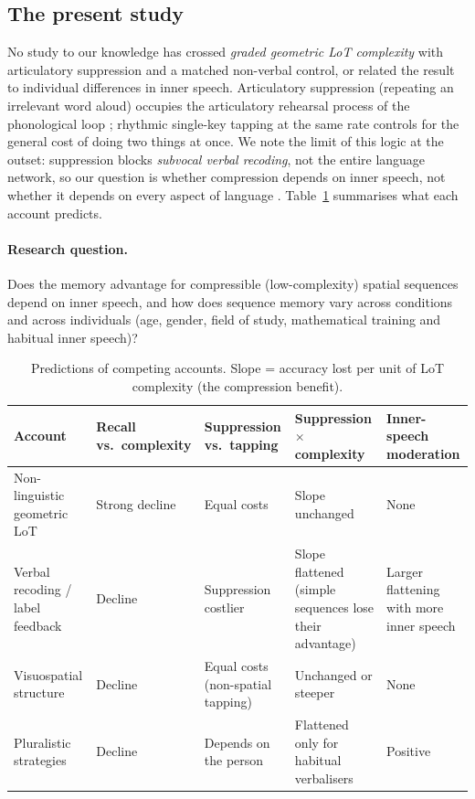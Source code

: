 \documentclass[11pt,a4paper]{article}
\begin{document}
\subsection{The present study}
No study to our knowledge has crossed \emph{graded geometric LoT complexity} with articulatory suppression and a matched
non-verbal control, or related the result to individual differences in inner speech. Articulatory suppression (repeating an
irrelevant word aloud) occupies the articulatory rehearsal process of the phonological loop
\citep{baddeley1984exploring,baddeley2012working}; rhythmic single-key tapping at the same rate controls for the general cost
of doing two things at once. We note the limit of this logic at the outset: suppression blocks \emph{subvocal verbal recoding},
not the entire language network, so our question is whether compression depends on inner speech, not whether it depends on
every aspect of language \citep{fedorenko2024language}. Table~\ref{tab:predictions} summarises what each account predicts.

\paragraph{Research question.} Does the memory advantage for compressible (low-complexity) spatial sequences depend on inner
speech, and how does sequence memory vary across conditions and across individuals (age, gender, field of study, mathematical
training and habitual inner speech)?

\begin{table}[t]\centering\small
\caption{Predictions of competing accounts. Slope = accuracy lost per unit of LoT complexity (the compression benefit).}
\label{tab:predictions}
\begin{tabular}{p{3.6cm}p{2.3cm}p{2.5cm}p{2.9cm}p{2.6cm}}\toprule
Account & Recall vs.\ complexity & Suppression vs.\ tapping & Suppression $\times$ complexity & Inner-speech moderation \\ \midrule
Non-linguistic geometric LoT \citep{dehaene2022symbols,fedorenko2024language} & Strong decline & Equal costs & Slope unchanged & None \\
Verbal recoding / label feedback \citep{lupyan2012linguistically,emerson2003role} & Decline & Suppression costlier & Slope flattened (simple sequences lose their advantage) & Larger flattening with more inner speech \\
Visuospatial structure \citep{kemps2001complexity,allen2024maintaining} & Decline & Equal costs (non-spatial tapping) & Unchanged or steeper & None \\
Pluralistic strategies \citep{nedergaard2024not,seabra2025verbal} & Decline & Depends on the person & Flattened only for habitual verbalisers & Positive \\ \bottomrule
\end{tabular}
\end{table}
\end{document}
